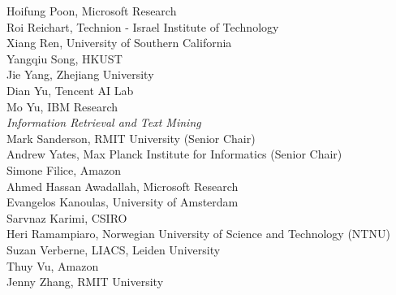 \hspace*{0.2in} Hoifung Poon, Microsoft Research\\
\hspace*{0.2in} Roi Reichart, Technion - Israel Institute of Technology\\
\hspace*{0.2in} Xiang Ren, University of Southern California\\
\hspace*{0.2in} Yangqiu Song, HKUST\\
\hspace*{0.2in} Jie Yang, Zhejiang University\\
\hspace*{0.2in} Dian Yu, Tencent AI Lab\\
\hspace*{0.2in} Mo Yu, IBM Research\\

\emph{Information Retrieval and Text Mining} \\
\hspace*{0.2in} Mark Sanderson, RMIT University (Senior Chair)\\
\hspace*{0.2in} Andrew Yates, Max Planck Institute for Informatics (Senior Chair)\\
\hspace*{0.2in} Simone Filice, Amazon\\
\hspace*{0.2in} Ahmed Hassan Awadallah, Microsoft Research\\
\hspace*{0.2in} Evangelos Kanoulas, University of Amsterdam\\
\hspace*{0.2in} Sarvnaz Karimi, CSIRO\\
\hspace*{0.2in} Heri Ramampiaro, Norwegian University of Science and Technology (NTNU)\\
\hspace*{0.2in} Suzan Verberne, LIACS, Leiden University\\
\hspace*{0.2in} Thuy Vu, Amazon\\
\hspace*{0.2in} Jenny Zhang, RMIT University\\

